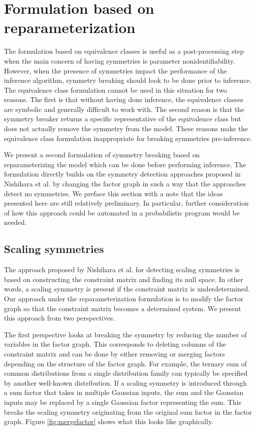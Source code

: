 

\section{Formulation based on reparameterization}

The formulation based on equivalence classes is useful as a post-processing step when the main concern of having symmetries is parameter nonidentifiability. However, when the presence of symmetries impact the performance of the inference algorithm, symmetry breaking should look to be done prior to inference. The equivalence class formulation cannot be used in this situation for two reasons. The first is that without having done inference, the equivalence classes are symbolic and generally difficult to work with. The second reason is that the symmetry breaker returns a specific representative of the equivalence class but does not actually remove the symmetry from the model. These reasons make the equivalence class formulation inappropriate for breaking symmetries pre-inference.

We present a second formulation of symmetry breaking based on reparameterizing the model which can be done before performing inference. The formulation directly builds on the symmetry detection approaches proposed in Nishihara et al. by changing the factor graph in such a way that the approaches detect no symmetries. We preface this section with a note that the ideas presented here are still relatively preliminary. In particular, further consideration of how this approach could be automated in a probabilistic program would be needed.


\subsection{Scaling symmetries}

The approach proposed by Nishihara et al. for detecting scaling symmetries is based on constructing the constraint matrix and finding its null space. In other words, a scaling symmetry is present if the constraint matrix is underdetermined. Our approach under the reparameterization formulation is to modify the factor graph so that the constraint matrix becomes a determined system. We present this approach from two perspectives. 

The first perspective looks at breaking the symmetry by reducing the number of variables in the factor graph. This corresponds to deleting columns of the constraint matrix and can be done by either removing or merging factors depending on the structure of the factor graph. For example, the ternary sum of common distributions from a single distribution family can typically be specified by another well-known distribution. If a scaling symmetry is introduced through a sum factor that takes in multiple Gaussian inputs, the sum and the Gaussian inputs may be replaced by a single Gaussian factor representing the sum. This breaks the scaling symmetry originating from the original sum factor in the factor graph. Figure \ref{fig:mergefactor} shows what this looks like graphically.

